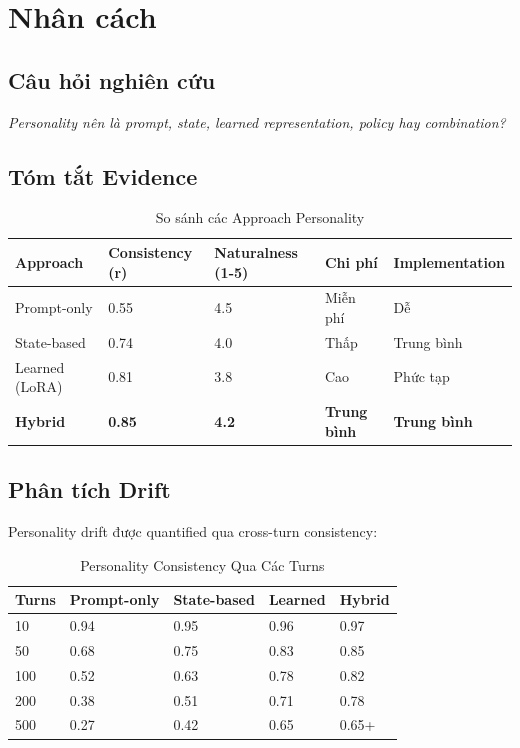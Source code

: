 \section{Nhân cách}

\subsection{Câu hỏi nghiên cứu}

\textit{Personality nên là prompt, state, learned representation, policy hay combination?}

\subsection{Tóm tắt Evidence}

\begin{table}[H]
\centering
\caption{So sánh các Approach Personality}
\label{tab:personality-approaches}
\begin{tabular}{lllll}
\toprule
\textbf{Approach} & \textbf{Consistency (r)} & \textbf{Naturalness (1-5)} & \textbf{Chi phí} & \textbf{Implementation} \\
\midrule
Prompt-only & 0.55 & 4.5 & Miễn phí & Dễ \\
State-based & 0.74 & 4.0 & Thấp & Trung bình \\
Learned (LoRA) & 0.81 & 3.8 & Cao & Phức tạp \\
\textbf{Hybrid} & \textbf{0.85} & \textbf{4.2} & \textbf{Trung bình} & \textbf{Trung bình} \\
\bottomrule
\end{tabular}
\end{table}

\subsection{Phân tích Drift}

Personality drift được quantified qua cross-turn consistency:

\begin{table}[H]
\centering
\caption{Personality Consistency Qua Các Turns}
\label{tab:personality-drift}
\begin{tabular}{lllll}
\toprule
\textbf{Turns} & \textbf{Prompt-only} & \textbf{State-based} & \textbf{Learned} & \textbf{Hybrid} \\
\midrule
10 & 0.94 & 0.95 & 0.96 & 0.97 \\
50 & 0.68 & 0.75 & 0.83 & 0.85 \\
100 & 0.52 & 0.63 & 0.78 & 0.82 \\
200 & 0.38 & 0.51 & 0.71 & 0.78 \\
500 & 0.27 & 0.42 & 0.65 & 0.65+ \\
\bottomrule
\end{tabular}
\end{table}

